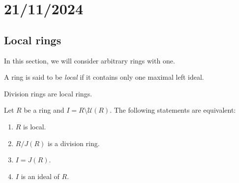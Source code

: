 \section{21/11/2024}
\label{09}

\subsection{Local rings}

In this section, we will consider arbitrary rings with one. 

\begin{definition}
    A ring is said to be \emph{local} if it contains only one maximal left ideal. 
\end{definition}

Division rings are local rings. 


\begin{theorem}
\label{thm:local}
    Let $R$ be a ring and $I=R\setminus\mathcal{U}(R)$. The following
    statements are equivalent:
    \begin{enumerate}
        \item $R$ is local.
        \item $R/J(R)$ is a division ring.
        \item $I=J(R)$.
        \item $I$ is an ideal of $R$.
    \end{enumerate}
\end{theorem}

